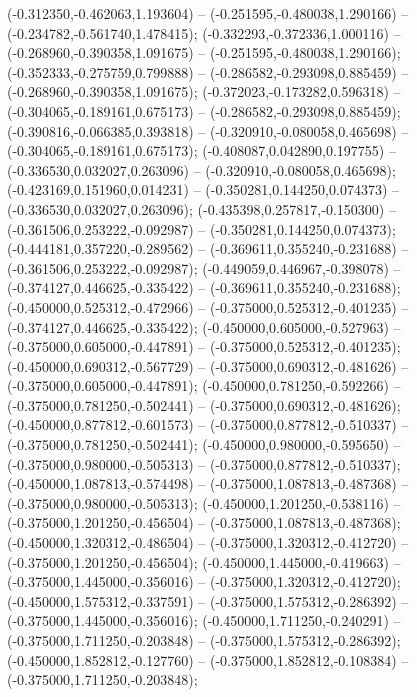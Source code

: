 (-0.312350,-0.462063,1.193604) -- (-0.251595,-0.480038,1.290166) -- (-0.234782,-0.561740,1.478415);
 (-0.332293,-0.372336,1.000116) -- (-0.268960,-0.390358,1.091675) -- (-0.251595,-0.480038,1.290166);
 (-0.352333,-0.275759,0.799888) -- (-0.286582,-0.293098,0.885459) -- (-0.268960,-0.390358,1.091675);
 (-0.372023,-0.173282,0.596318) -- (-0.304065,-0.189161,0.675173) -- (-0.286582,-0.293098,0.885459);
 (-0.390816,-0.066385,0.393818) -- (-0.320910,-0.080058,0.465698) -- (-0.304065,-0.189161,0.675173);
 (-0.408087,0.042890,0.197755) -- (-0.336530,0.032027,0.263096) -- (-0.320910,-0.080058,0.465698);
 (-0.423169,0.151960,0.014231) -- (-0.350281,0.144250,0.074373) -- (-0.336530,0.032027,0.263096);
 (-0.435398,0.257817,-0.150300) -- (-0.361506,0.253222,-0.092987) -- (-0.350281,0.144250,0.074373);
 (-0.444181,0.357220,-0.289562) -- (-0.369611,0.355240,-0.231688) -- (-0.361506,0.253222,-0.092987);
 (-0.449059,0.446967,-0.398078) -- (-0.374127,0.446625,-0.335422) -- (-0.369611,0.355240,-0.231688);
 (-0.450000,0.525312,-0.472966) -- (-0.375000,0.525312,-0.401235) -- (-0.374127,0.446625,-0.335422);
 (-0.450000,0.605000,-0.527963) -- (-0.375000,0.605000,-0.447891) -- (-0.375000,0.525312,-0.401235);
 (-0.450000,0.690312,-0.567729) -- (-0.375000,0.690312,-0.481626) -- (-0.375000,0.605000,-0.447891);
 (-0.450000,0.781250,-0.592266) -- (-0.375000,0.781250,-0.502441) -- (-0.375000,0.690312,-0.481626);
 (-0.450000,0.877812,-0.601573) -- (-0.375000,0.877812,-0.510337) -- (-0.375000,0.781250,-0.502441);
 (-0.450000,0.980000,-0.595650) -- (-0.375000,0.980000,-0.505313) -- (-0.375000,0.877812,-0.510337);
 (-0.450000,1.087813,-0.574498) -- (-0.375000,1.087813,-0.487368) -- (-0.375000,0.980000,-0.505313);
 (-0.450000,1.201250,-0.538116) -- (-0.375000,1.201250,-0.456504) -- (-0.375000,1.087813,-0.487368);
 (-0.450000,1.320312,-0.486504) -- (-0.375000,1.320312,-0.412720) -- (-0.375000,1.201250,-0.456504);
 (-0.450000,1.445000,-0.419663) -- (-0.375000,1.445000,-0.356016) -- (-0.375000,1.320312,-0.412720);
 (-0.450000,1.575312,-0.337591) -- (-0.375000,1.575312,-0.286392) -- (-0.375000,1.445000,-0.356016);
 (-0.450000,1.711250,-0.240291) -- (-0.375000,1.711250,-0.203848) -- (-0.375000,1.575312,-0.286392);
 (-0.450000,1.852812,-0.127760) -- (-0.375000,1.852812,-0.108384) -- (-0.375000,1.711250,-0.203848);
